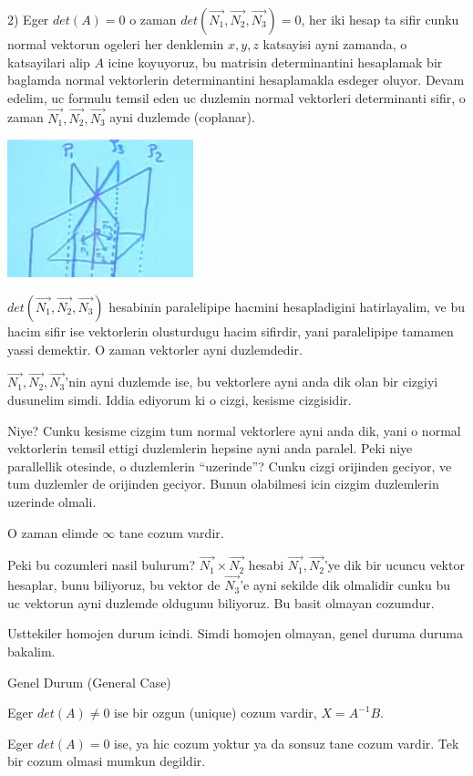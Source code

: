 \documentclass[12pt,fleqn]{article}
\begin{document}
2) Eger $det(A) = 0$ o zaman $det(\vec{N_1},\vec{N_2},\vec{N_3}) = 0$, her
iki hesap ta sifir cunku normal vektorun ogeleri her denklemin $x,y,z$
katsayisi ayni zamanda, o katsayilari alip $A$ icine koyuyoruz, bu matrisin
determinantini hesaplamak bir baglamda normal vektorlerin determinantini
hesaplamakla esdeger oluyor. Devam edelim, uc formulu temsil eden uc
duzlemin normal vektorleri determinanti sifir, o zaman 
$\vec{N_1},\vec{N_2},\vec{N_3}$ ayni duzlemde (coplanar).

\includegraphics[height=4cm]{4_5.png}

$det(\vec{N_1},\vec{N_2},\vec{N_3})$ hesabinin paralelipipe hacmini hesapladigini hatirlayalim, ve 
bu hacim sifir ise vektorlerin olusturdugu hacim sifirdir, yani paralelipipe 
tamamen yassi demektir. O zaman vektorler ayni duzlemdedir. 

$\vec{N_1},\vec{N_2},\vec{N_3}$'nin ayni duzlemde ise, bu vektorlere ayni
anda dik olan bir cizgiyi dusunelim simdi. Iddia ediyorum ki o cizgi,
kesisme cizgisidir.

Niye? Cunku kesisme cizgim tum normal vektorlere ayni anda dik, yani o
normal vektorlerin temsil ettigi duzlemlerin hepsine ayni anda
paralel. Peki niye parallellik otesinde, o duzlemlerin ``uzerinde''? Cunku
cizgi orijinden geciyor, ve tum duzlemler de orijinden geciyor. Bunun
olabilmesi icin cizgim duzlemlerin uzerinde olmali.

O zaman elimde $\infty$ tane cozum vardir. 

Peki bu cozumleri nasil bulurum? $\vec{N_1} \times \vec{N_2}$ hesabi
$\vec{N_1},\vec{N_2}$'ye dik bir ucuncu vektor hesaplar, bunu biliyoruz, bu
vektor de $\vec{N_3}$'e ayni sekilde dik olmalidir cunku bu uc vektorun
ayni duzlemde oldugunu biliyoruz. Bu basit olmayan cozumdur.

Usttekiler homojen durum icindi. Simdi homojen olmayan, genel duruma duruma
bakalim.

Genel Durum (General Case)

Eger $det(A) \ne 0$ ise bir ozgun (unique) cozum vardir, $X = A^{-1}B$. 

Eger $det(A) = 0$ ise, ya hic cozum yoktur ya da sonsuz tane cozum
vardir. Tek bir cozum olmasi mumkun degildir. 
\end{document}

